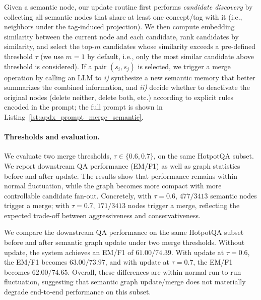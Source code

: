{Given a semantic node, our update routine first performs \emph{candidate discovery} by collecting all semantic nodes that share at least one concept/tag with it (i.e., neighbors under the tag-induced projection). We then compute embedding similarity between the current node and each candidate, rank candidates by similarity, and select the top-$m$ candidates whose similarity exceeds a pre-defined threshold $\tau$ (we use $m{=}1$ by default, i.e., only the most similar candidate above threshold is considered). If a pair $(s_i, s_j)$ is selected, we trigger a merge operation by calling an LLM to \textit{i)} synthesize a new semantic memory that better summarizes the combined information, and \textit{ii)} decide whether to deactivate the original nodes (delete neither, delete both, etc.) according to explicit rules encoded in the prompt; the full prompt is shown in Listing~\ref{lst:apdx_prompt_merge_semantic}.



\paragraph{Thresholds and evaluation.}
We evaluate two merge thresholds, $\tau \in \{0.6, 0.7\}$, on the same HotpotQA subset. We report downstream QA performance (EM/F1) as well as graph statistics before and after update.
The results show that performance remains within normal fluctuation, while the graph becomes more compact with more controllable candidate fan-out. Concretely, with $\tau{=}0.6$, $477/3413$ semantic nodes trigger a merge; with $\tau{=}0.7$, $171/3413$ nodes trigger a merge, reflecting the expected trade-off between aggressiveness and conservativeness.

We compare the downstream QA performance on the same HotpotQA subset before and after semantic graph update under two merge thresholds. Without update, the system achieves an EM/F1 of $61.00/74.39$. With update at $\tau{=}0.6$, the EM/F1 becomes $63.00/73.97$, and with update at $\tau{=}0.7$, the EM/F1 becomes $62.00/74.65$. Overall, these differences are within normal run-to-run fluctuation, suggesting that semantic graph update/merge does not materially degrade end-to-end performance on this subset.

}
